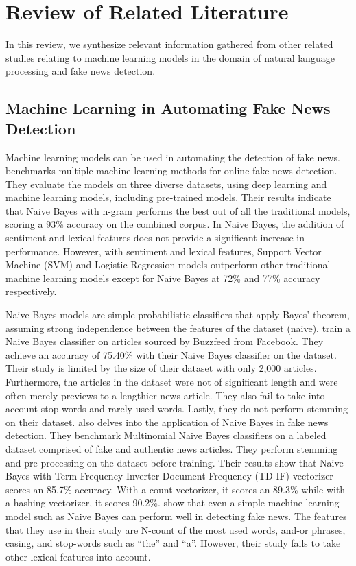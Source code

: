 \chapter{Review of Related Literature}
\label{sec:relatedlit}

In this review, we synthesize relevant information gathered from other related studies relating to machine learning models in the domain of natural language processing and fake news detection.

\section{Machine Learning in Automating Fake News Detection}

Machine learning models can be used in automating the detection of fake news.  benchmarks multiple machine learning methods for online fake news detection. They evaluate the models on three diverse datasets, using deep learning and machine learning models, including pre-trained models. Their results indicate that Naive Bayes with n-gram performs the best out of all the traditional models, scoring a 93\% accuracy on the combined corpus. In Naive Bayes, the addition of sentiment and lexical features does not provide a significant increase in performance. However, with sentiment and lexical features, Support Vector Machine (SVM) and Logistic Regression models outperform other traditional machine learning models except for Naive Bayes at 72\% and 77\% accuracy respectively.

Naive Bayes models are simple probabilistic classifiers that apply Bayes' theorem, assuming strong independence between the features of the dataset (naive).  train a Naive Bayes classifier on articles sourced by Buzzfeed from Facebook. They achieve an accuracy of 75.40\% with their Naive Bayes classifier on the dataset. Their study is limited by the size of their dataset with only 2,000 articles. Furthermore, the articles in the dataset were not of significant length and were often merely previews to a lengthier news article. They also fail to take into account stop-words and rarely used words. Lastly, they do not perform stemming on their dataset.  also delves into the application of Naive Bayes in fake news detection. They benchmark Multinomial Naive Bayes classifiers on a labeled dataset comprised of fake and authentic news articles. They perform stemming and pre-processing on the dataset before training. Their results show that Naive Bayes with Term Frequency-Inverter Document Frequency (TD-IF) vectorizer scores an 85.7\% accuracy. With a count vectorizer, it scores an 89.3\% while with a hashing vectorizer, it scores 90.2\%.  show that even a simple machine learning model such as Naive Bayes can perform well in detecting fake news. The features that they use in their study are N-count of the most used words, and-or phrases, casing, and stop-words such as \enquote{the} and \enquote{a}. However, their study fails to take other lexical features into account.

